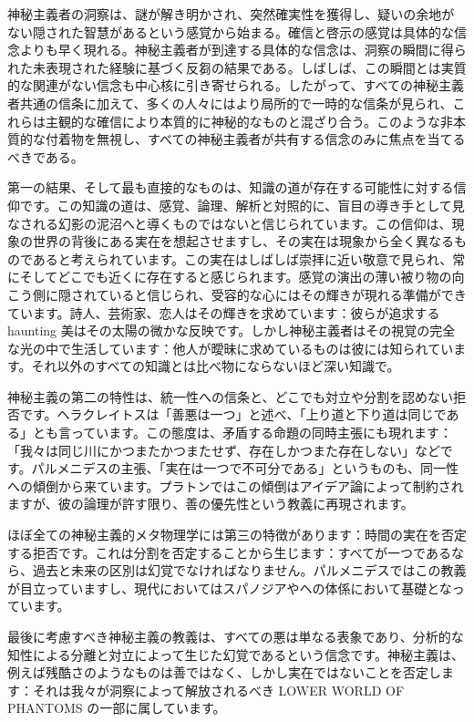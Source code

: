 \documentclass[a4paper,11pt,openany]{ltjsbook}
\begin{document}
神秘主義者の洞察は、謎が解き明かされ、突然確実性を獲得し、疑いの余地がない隠された智慧があるという感覚から始まる。確信と啓示の感覚は具体的な信念よりも早く現れる。神秘主義者が到達する具体的な信念は、洞察の瞬間に得られた未表現された経験に基づく反芻の結果である。しばしば、この瞬間とは実質的な関連がない信念も中心核に引き寄せられる。したがって、すべての神秘主義者共通の信条に加えて、多くの人々にはより局所的で一時的な信条が見られ、これらは主観的な確信により本質的に神秘的なものと混ざり合う。このような非本質的な付着物を無視し、すべての神秘主義者が共有する信念のみに焦点を当てるべきである。


第一の結果、そして最も直接的なものは、知識の道が存在する可能性に対する信仰です。この知識の道は、感覚、論理、解析と対照的に、盲目の導き手として見なされる幻影の泥沼へと導くものではないと信じられています。この信仰は、現象の世界の背後にある実在を想起させますし、その実在は現象から全く異なるものであると考えられています。この実在はしばしば崇拝に近い敬意で見られ、常にそしてどこでも近くに存在すると感じられます。感覚の演出の薄い被り物の向こう側に隠されていると信じられ、受容的な心にはその輝きが現れる準備ができています。詩人、芸術家、恋人はその輝きを求めています：彼らが追求する haunting 美はその太陽の微かな反映です。しかし神秘主義者はその視覚の完全な光の中で生活しています：他人が曖昧に求めているものは彼には知られています。それ以外のすべての知識とは比べ物にならないほど深い知識で。

神秘主義の第二の特性は、統一性への信条と、どこでも対立や分割を認めない拒否です。ヘラクレイトスは「善悪は一つ」と述べ、「上り道と下り道は同じである」とも言っています。この態度は、矛盾する命題の同時主張にも現れます：「我々は同じ川にかつまたかつまたせず、存在しかつまた存在しない」などです。パルメニデスの主張、「実在は一つで不可分である」というものも、同一性への傾倒から来ています。プラトンではこの傾倒はアイデア論によって制約されますが、彼の論理が許す限り、善の優先性という教義に再現されます。

ほぼ全ての神秘主義的メタ物理学には第三の特徴があります：時間の実在を否定する拒否です。これは分割を否定することから生じます：すべてが一つであるなら、過去と未来の区別は幻覚でなければなりません。パルメニデスではこの教義が目立っていますし、現代においてはスパノジアやヘの体係において基礎となっています。


最後に考慮すべき神秘主義の教義は、すべての悪は単なる表象であり、分析的な知性による分離と対立によって生じた幻覚であるという信念です。神秘主義は、例えば残酷さのようなものは善ではなく、しかし実在ではないことを否定します：それは我々が洞察によって解放されるべき LOWER WORLD OF PHANTOMS の一部に属しています。
\end{document}
